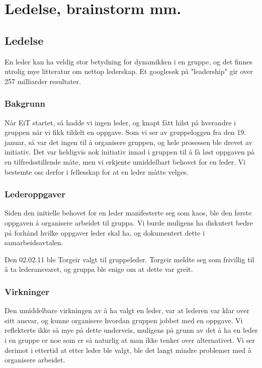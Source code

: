 \chapter{Ledelse, brainstorm mm.}
\section{Ledelse}
En leder kan ha veldig stor betydning for dynamikken i en gruppe, og det finnes
utrolig mye litteratur om nettop lederskap. Et googlesøk på "leadership" gir
over 257 milliarder resultater.

\subsection{Bakgrunn}
Når EiT startet, så hadde vi ingen leder, og knapt fått hilst på hverandre i
gruppen når vi fikk tildelt en oppgave. Som vi ser av gruppeloggen fra den 19.
januar, så var det ingen til å organisere gruppen, og hele prosessen ble drevet
av initiativ. Det var heldigvis nok initiativ innad i gruppen til å få løst
oppgaven på en tilfredsstillende måte, men vi erkjente umiddelbart behovet for
en leder. Vi bestemte oss derfor i fellesskap for at en leder måtte velges.

\subsection{Lederoppgaver}
Siden den initielle behovet for en leder manifesterte seg som kaos, ble den
første oppgaven å organisere arbeidet til gruppa.
Vi burde muligens ha diskutert bedre på forhånd hvilke oppgaver leder skal ha,
og dokumentert dette i samarbeidsavtalen.

Den 02.02.11 ble Torgeir valgt til gruppeleder. Torgeir meldte seg som frivillig
til å ta lederansvaret, og gruppa ble enige om at dette var greit.

\subsection{Virkninger}
Den umiddelbare virkningen av å ha valgt en leder, var at lederen var klar over
sitt ansvar, og kunne organisere hvordan gruppen jobbet med en oppgave. Vi 
reflekterte ikke så mye på dette underveis, muligens på grunn av det å ha en
leder i en gruppe er noe som er så naturlig at man ikke tenker over
alternativet. Vi ser derimot i ettertid at etter leder ble valgt, ble det langt
mindre problemer med å organisere arbeidet.

